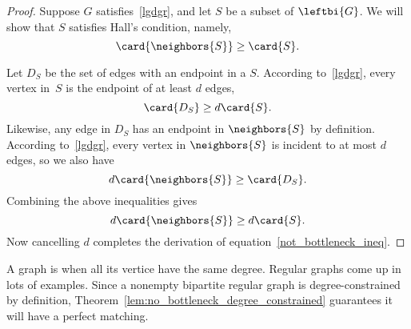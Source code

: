 \begin{proof}
Suppose $G$ satisfies~\eqref{lgdgr}, and let $S$ be a subset of
$\leftbi{G}$.  We will show that $S$ satisfies Hall's condition,
namely,
\begin{equation}\label{not_bottleneck_ineq}
  \card{\neighbors{S}} \geq \card{S}.
\end{equation}

Let $D_S$ be the set of edges with an endpoint in a $S$.  According
to~\eqref{lgdgr}, every vertex in~$S$ is the endpoint of at least $d$
edges,
\[
\card{D_S} \geq d\card{S}.
\]
Likewise, any edge in $D_S$ has an endpoint in $\neighbors{S}$ by
definition.  According to~\eqref{lgdgr}, every vertex in
$\neighbors{S}$ is incident to at most $d$ edges, so we also have
\[
d\card{\neighbors{S}} \geq \card{D_S}.
\]
Combining the above inequalities gives
\[
d\card{\neighbors{S}} \ge d\card{S}.
\]
Now cancelling $d$ completes the derivation of
equation~\eqref{not_bottleneck_ineq}.
\end{proof}

A graph is  when all its vertice have the same degree.
Regular graphs come up in lots of examples.  Since a nonempty
bipartite regular graph is degree-constrained by definition,
Theorem~\ref{lem:no_bottleneck_degree_constrained} guarantees it will
have a perfect matching.

\iffalse
\begin{definition}\label{def:5P}
A graph is said to be \emph{regular} if every vertex has the same degree.
\end{definition}

\begin{theorem}\label{thm:5M}
Every regular bipartite graph has a perfect matching.
\end{theorem}

\begin{proof}
  Let $G$ be a regular bipartite graph.  Since regular graphs are
  degree-constrained, we know by
  Theorem~\ref{lem:no_bottleneck_degree_constrained} that there must
  be a matching in~$G$ that covers~$\leftbi{G}$.  Such a matching is
  only possible when $\card{\leftbi{G}} \leq \card{\rightbi{G}}$.  But
  $G$ is also degree-constrained if the roles of $\leftbi{G}$ and
  $\rightbi{G}$ are switched, which implies that $\card{\rightbi{G}}
  \leq \card{\leftbi{G}}$ also.  That is, $\leftbi{G}$ and
  $\rightbi{G}$ are the same size, and any matching covering
  $\leftbi{G}$ will also cover $\rightbi{G}$.  So every vertex in~$G$ is
  an endpoint of an edge in the matching, and thus $G$ has a perfect
  matching.
\end{proof}
\fi

